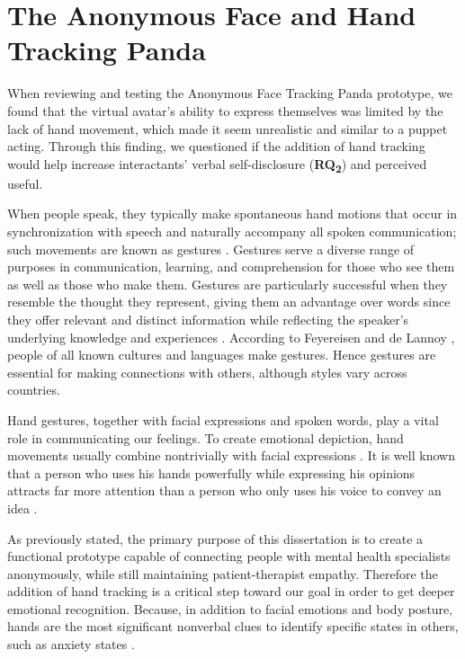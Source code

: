 \section{The Anonymous Face and Hand Tracking Panda}
When reviewing and testing the Anonymous Face Tracking Panda prototype, we found that the virtual avatar's ability to express themselves was limited by the lack of hand movement, which made it seem unrealistic and similar to a puppet acting. Through this finding, we questioned if the addition of hand tracking would help increase interactants' verbal self-disclosure (\textbf{RQ\textsubscript{2}}) and perceived useful.

When people speak, they typically make spontaneous hand motions that occur in synchronization with speech and naturally accompany all spoken communication; such movements are known as gestures \cite{CLO20}. Gestures serve a diverse range of purposes in communication, learning, and comprehension for those who see them as well as those who make them. Gestures are particularly successful when they resemble the thought they represent, giving them an advantage over words since they offer relevant and distinct information while reflecting the speaker's underlying knowledge and experiences \cite{CLO20, KAN16B}. According to Feyereisen and de Lannoy \cite{FEY91}, people of all known cultures and languages make gestures. Hence gestures are essential for making connections with others, although styles vary across countries.

Hand gestures, together with facial expressions and spoken words, play a vital role in communicating our feelings. To create emotional depiction, hand movements usually combine nontrivially with facial expressions \cite{ARJ20}. It is well known that a person who uses his hands powerfully while expressing his opinions attracts far more attention than a person who only uses his voice to convey an idea \cite{COO10, WAK18}.

As previously stated, the primary purpose of this dissertation is to create a functional prototype capable of connecting people with mental health specialists anonymously, while still maintaining patient-therapist empathy. Therefore the addition of hand tracking is a critical step toward our goal in order to get deeper emotional recognition. Because, in addition to facial emotions and body posture, hands are the most significant nonverbal clues to identify specific states in others, such as anxiety states \cite{WAX97, REI22}. 

